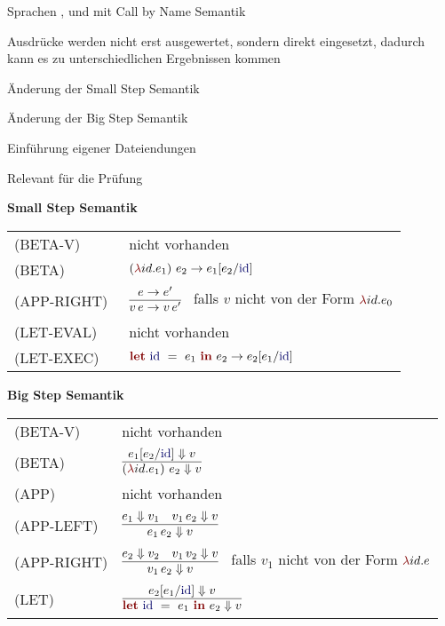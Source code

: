 {
  \begin{itemgroup}{}
    \item Sprachen \LZEROCBN, \LONECBN und \LTWOCBN  mit Call by Name Semantik
    \item Ausdrücke werden nicht erst ausgewertet, sondern direkt eingesetzt,
          dadurch kann es zu unterschiedlichen Ergebnissen kommen
    \item Änderung der Small Step Semantik
    \item Änderung der Big Step Semantik
    \item Einführung eigener Dateiendungen
    \item Relevant für die Prüfung \glqq \TPONE \grqq
  \end{itemgroup}
}


{
  {\bf Small Step Semantik}\\[5mm]
  \begin{tabular}{ll}
     \mbox{(BETA-V)}      & nicht vorhanden \\[3mm]
     \mbox{(BETA)}        & $\ExprApplication{\Parenthesis{\ExprLambda{id}{}{e_1}}}{e_2} \to
                                               e_1[e_2/\ExprIdentifier{id}]$ \\[3mm]
     \mbox{(APP-RIGHT)\ } & $\smallsteprule{e \to e'}
                              {v\,e \to v\,e'}$ \ 
                              falls ${v}$ nicht von der Form $\ExprLambda{id}{}{e_0}$ \\[5mm]
     \mbox{(LET-EVAL)\  } & nicht vorhanden \\[3mm]
     \mbox{(LET-EXEC)}    & $\ExprLet{\ExprIdentifier{id}}{}{e_1}{e_2} \to
                                      e_2[e_1/\ExprIdentifier{id}]$ \\[3mm]
  \end{tabular}
}


{
  {\bf Big Step Semantik}\\[5mm]
  \begin{tabular}{ll}
     \mbox{(BETA-V)}      & nicht vorhanden \\[3mm]
     \mbox{(BETA)}        & $\bigsteprule{e_1[e_2/\ExprIdentifier{id}] \eval v}
                              {\ExprApplication{\Parenthesis{\ExprLambda{id}{}{e_1}}}{e_2} \eval v}$ \\[5mm]
     \mbox{(APP)}         & nicht vorhanden \\[3mm]
     \mbox{(APP-LEFT)}    & $\bigsteprule{e_1 \eval v_1 \quad v_1\,e_2 \eval v}
                              {e_1\,e_2 \eval v}$ \\[5mm]
     \mbox{(APP-RIGHT)}   & $\bigsteprule{e_2 \eval v_2 \quad v_1\,v_2 \eval v}
                              {v_1\,e_2 \eval v}$ \ 
                              falls ${v_1}$ nicht von der Form $\ExprLambda{id}{}{e}$ \\[5mm]
     \mbox{(LET)}         & $\bigsteprule{e_2[e_1/\ExprIdentifier{id}] \eval v}
                              {\ExprLet{\ExprIdentifier{id}}{}{e_1}{e_2} \eval v}$ \\[5mm]
  \end{tabular}
}



